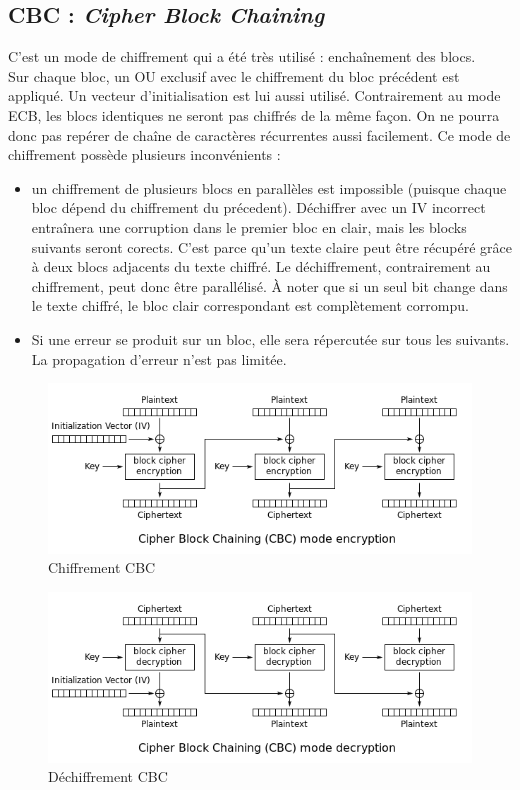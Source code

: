 \subsection{CBC : \textit{Cipher Block Chaining}}
C'est un mode de chiffrement qui a été très utilisé : enchaînement des blocs.\\
Sur chaque bloc, un OU exclusif avec le chiffrement du bloc précédent est appliqué. Un vecteur d'initialisation est lui aussi utilisé. Contrairement au mode ECB, les blocs identiques ne seront pas chiffrés de la même façon. On ne pourra donc pas repérer de chaîne de caractères récurrentes aussi facilement. Ce mode de chiffrement possède plusieurs inconvénients :
\begin{itemize}
\item un chiffrement de plusieurs blocs en parallèles est impossible (puisque chaque bloc dépend du chiffrement du précedent). Déchiffrer avec un IV incorrect entraînera une corruption dans le premier bloc en clair, mais les blocks suivants seront corects. C'est parce qu'un texte claire peut être récupéré grâce à deux blocs adjacents du texte chiffré. Le déchiffrement, contrairement au chiffrement, peut donc être parallélisé. À noter que si un seul bit change dans le texte chiffré, le bloc clair correspondant est complètement corrompu.
\item Si une erreur se produit sur un bloc, elle sera répercutée sur tous les suivants. La propagation d'erreur n'est pas limitée.
\end{itemize}
\begin{figure}[H]
\centering
\includegraphics[width=13cm]{images/CBC_chiff.png}
\caption{Chiffrement CBC}
\label{CBC_chiff}
\end{figure}

\begin{figure}[H]
\centering
\includegraphics[width=13cm]{images/CBC_dechiff.png}
\caption{Déchiffrement CBC}
\label{CBC_dechiff}
\end{figure}

